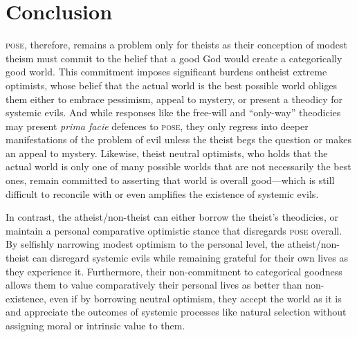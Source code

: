 \section*{Conclusion}

\textsc{pose}, therefore, remains a problem only for theists as their conception
of modest theism must commit to the belief that a good God would create
a categorically good world. This commitment imposes significant burdens
ontheist extreme optimists, whose belief that the actual world is the
best possible world obliges them either to embrace pessimism, appeal to
mystery, or present a theodicy for systemic evils. And while responses
like the free-will and ``only-way'' theodicies may present \emph{prima
facie} defences to \textsc{pose}, they only regress into deeper manifestations of
the problem of evil unless the theist begs the question or makes an
appeal to mystery. Likewise, theist neutral optimists, who holds that
the actual world is only one of many possible worlds that are not
necessarily the best ones, remain committed to asserting that world is
overall good---which is still difficult to reconcile with or even
amplifies the existence of systemic evils.

In contrast, the atheist/non-theist can either borrow the
theist's theodicies, or maintain a personal comparative optimistic
stance that disregards \textsc{pose} overall. By selfishly narrowing modest
optimism to the personal level, the atheist/non-theist can disregard
systemic evils while remaining grateful for their own lives as they
experience it. Furthermore, their non-commitment to categorical goodness
allows them to value comparatively their personal lives as better than
non-existence, even if by borrowing neutral optimism, they accept the
world as it is and appreciate the outcomes of systemic processes like
natural selection without assigning moral or intrinsic value to them.


